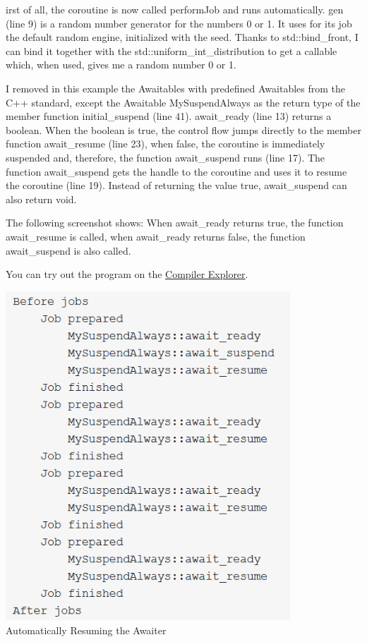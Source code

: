 irst of all, the coroutine is now called performJob and runs automatically. gen (line 9) is a random number generator for the numbers 0 or 1. It uses for its job the default random engine, initialized with the seed. Thanks to std::bind\_front, I can bind it together with the std::uniform\_int\_distribution to get a callable which, when used, gives me a random number 0 or 1.

I removed in this example the Awaitables with predefined Awaitables from the C++ standard, except the Awaitable MySuspendAlways as the return type of the member function initial\_suspend (line 41). await\_ready (line 13) returns a boolean. When the boolean is true, the control flow jumps directly to the member function await\_resume (line 23), when false, the coroutine is immediately suspended and, therefore, the function await\_suspend runs (line 17). The function await\_suspend gets the handle to the coroutine and uses it to resume the coroutine (line 19). Instead of returning the value true, await\_suspend can also return void.

The following screenshot shows: When await\_ready returns true, the function await\_resume is called, when await\_ready returns false, the function await\_suspend is also called.

You can try out the program on the \href{https://godbolt.org/z/8b1Y14}{Compiler Explorer}.

\begin{center}
\includegraphics[width=0.8\textwidth]{content/3/chapter7/images/20.png}\\
Automatically Resuming the Awaiter
\end{center}

